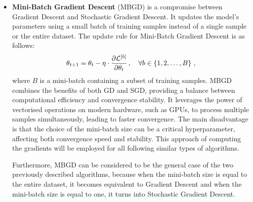 \begin{itemize}[leftmargin=1.5em]
    \item\textbf{Mini-Batch Gradient Descent} (MBGD) is a compromise between Gradient Descent and Stochastic Gradient Descent. It updates the model's parameters using a small batch of training samples instead of a single sample or the entire dataset. The update rule for Mini-Batch Gradient Descent is as follows:
    \begin{equation}
        \theta_{t+1} = \theta_{t} - \eta\cdot \dfrac{\partial \mathcal{L}^{[b]}}{\partial \theta_{t}}\,,\quad \forall b \in \left\{ 1, 2, \ldots, B \right\}\,,
    \end{equation}
    where $B$ is a mini-batch containing a subset of training samples. MBGD combines the benefits of both GD and SGD, providing a balance between computational efficiency and convergence stability. It leverages the power of vectorised operations on modern hardware, such as GPUs, to process multiple samples simultaneously, leading to faster convergence. The main disadvantage is that the choice of the mini-batch size can be a critical hyperparameter, affecting both convergence speed and stability. This approach of computing the gradients will be employed for all following similar types of algorithms.

    Furthermore, MBGD can be considered to be the general case of the two previously described algorithms, because when the mini-batch size is equal to the entire dataset, it becomes equivalent to Gradient Descent and when the mini-batch size is equal to one, it turns into Stochastic Gradient Descent.


\end{itemize}
